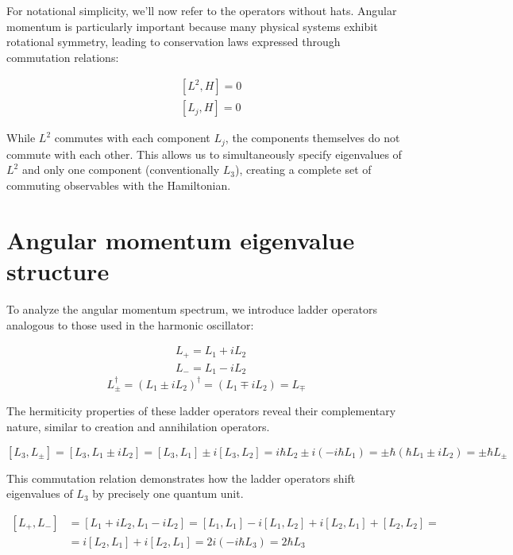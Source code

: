 For notational simplicity, we'll now refer to the operators without hats. Angular momentum is particularly important because many physical systems exhibit rotational symmetry, leading to conservation laws expressed through commutation relations:

\begin{align}
& {\left[L^{2}, H\right]=0} \\
& {\left[L_{j}, H\right]=0}
\end{align}

While $L^2$ commutes with each component $L_j$, the components themselves do not commute with each other. This allows us to simultaneously specify eigenvalues of $L^2$ and only one component (conventionally $L_3$), creating a complete set of commuting observables with the Hamiltonian.

\section{Angular momentum eigenvalue structure}
To analyze the angular momentum spectrum, we introduce ladder operators analogous to those used in the harmonic oscillator:

\begin{align}
& L_{+}=L_{1}+i L_{2} \\
& L_{-}=L_{1}-i L_{2}
\end{align}
\begin{equation}
L_{ \pm}^{\dagger}=\left(L_{1} \pm i L_{2}\right)^{\dagger}=\left(L_{1} \mp i L_{2}\right)=L_{\mp}
\end{equation}

The hermiticity properties of these ladder operators reveal their complementary nature, similar to creation and annihilation operators.

\begin{equation}
\left[L_{3}, L_{ \pm}\right]=\left[L_{3}, L_{1} \pm i L_{2}\right]=\left[L_{3}, L_{1}\right] \pm i\left[L_{3}, L_{2}\right]=i \hbar L_{2} \pm i\left(-i \hbar L_{1}\right)= \pm \hbar\left(\hbar L_{1} \pm i L_{2}\right)= \pm \hbar L_{ \pm}
\end{equation}

This commutation relation demonstrates how the ladder operators shift eigenvalues of $L_3$ by precisely one quantum unit.

\begin{align}
{\left[L_{+}, L_{-}\right] } & =\left[L_{1}+i L_{2}, L_{1}-i L_{2}\right]=\left[L_{1}, L_{1}\right]-i\left[L_{1}, L_{2}\right]+i\left[L_{2}, L_{1}\right]+\left[L_{2}, L_{2}\right]= \\
& =i\left[L_{2}, L_{1}\right]+i\left[L_{2}, L_{1}\right]=2 i\left(-i \hbar L_{3}\right)=2 \hbar L_{3}
\end{align}


